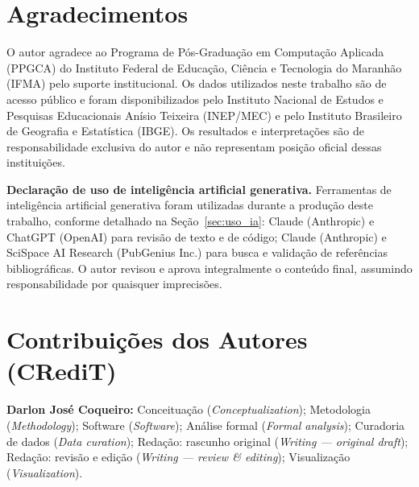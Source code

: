 \section{Agradecimentos}

O autor agradece ao Programa de Pós-Graduação em Computação Aplicada (PPGCA) do Instituto Federal de Educação, Ciência e Tecnologia do Maranhão (IFMA) pelo suporte institucional. Os dados utilizados neste trabalho são de acesso público e foram disponibilizados pelo Instituto Nacional de Estudos e Pesquisas Educacionais Anísio Teixeira (INEP/MEC) e pelo Instituto Brasileiro de Geografia e Estatística (IBGE). Os resultados e interpretações são de responsabilidade exclusiva do autor e não representam posição oficial dessas instituições.

\textbf{Declaração de uso de inteligência artificial generativa.} Ferramentas de inteligência artificial generativa foram utilizadas durante a produção deste trabalho, conforme detalhado na Seção~\ref{sec:uso_ia}: Claude (Anthropic) e ChatGPT (OpenAI) para revisão de texto e de código; Claude (Anthropic) e SciSpace AI Research (PubGenius Inc.) para busca e validação de referências bibliográficas. O autor revisou e aprova integralmente o conteúdo final, assumindo responsabilidade por quaisquer imprecisões.

\section{Contribuições dos Autores (CRediT)}

\textbf{Darlon José Coqueiro:} Conceituação (\textit{Conceptualization}); Metodologia (\textit{Methodology}); Software (\textit{Software}); Análise formal (\textit{Formal analysis}); Curadoria de dados (\textit{Data curation}); Redação: rascunho original (\textit{Writing --- original draft}); Redação: revisão e edição (\textit{Writing --- review \& editing}); Visualização (\textit{Visualization}).
